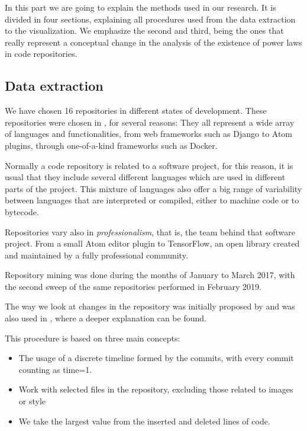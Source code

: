 \documentclass[conference]{IEEEtran}
\begin{document}
In this part we are going to explain the methods used in our research. It is divided in four sections, explaining all procedures used from the data extraction to the visualization. We emphasize the second and third, being the ones that really represent a conceptual change in the analysis of the existence of power laws in code repositories.

\subsection{Data extraction}
We have chosen 16 repositories in different states of development.
These repositories were chosen in \cite{Merelo2016:repomining}, for several reasons:  They all represent a wide array of languages and functionalities, from web frameworks such as Django to Atom plugins, through one-of-a-kind frameworks such as Docker.

 Normally a code repository is related to a software project, for this reason, it is usual that they include several
different languages which are used in different parts of the project.
This mixture of languages also offer a big range of variability between languages that are interpreted or compiled, either to machine code or to
bytecode. 

Repositories vary also in {\em professionalism}, that is, the team behind that software project. From a small Atom editor plugin to TensorFlow, an open library created and maintained by a fully professional community.

Repository mining was done during the months of January to March
2017, with the second sweep of the same repositories performed in
February 2019.

The way we look at changes in the repository was initially proposed by \cite{Merelo2016:repomining} and was also used in
\cite{merelo2017self}, where a deeper explanation can be found.


This procedure is based on three main concepts:
\begin{itemize}
	\item The usage of a discrete timeline formed by the
	commits, with every commit counting as time=1. 
	\item Work with selected files in the repository, excluding 
	those related to images or style
	\item We take the largest value from the inserted and deleted lines of code.
\end{itemize}
\end{document}
